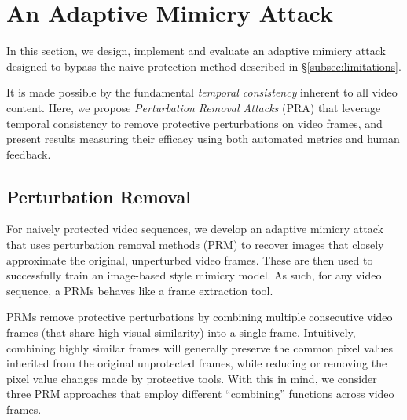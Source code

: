 \secspace
\section{An Adaptive Mimicry Attack} 
\label{sec:eval-limitations}
In this section, we design, implement and evaluate an adaptive mimicry attack
designed to bypass the naive protection method described in
\S\ref{subsec:limitations}. 

It is made possible by the fundamental {\em temporal consistency} inherent to
all video content. Here, we propose {\em Perturbation Removal Attacks} (PRA)
that leverage temporal consistency to remove protective perturbations on
video frames, and present results measuring their efficacy using both
automated metrics and human feedback.

\secspace
\subsection{Perturbation Removal}

For naively protected video sequences, we develop an adaptive mimicry attack
that uses perturbation removal methods (PRM) to recover images that closely
approximate the original, unperturbed video frames. These are then used to
successfully train an image-based style mimicry model.  As such, for any
video sequence, a PRMs behaves like a frame extraction tool.

 PRMs remove protective perturbations
by combining multiple consecutive video frames (that share high visual
similarity) into a single frame. Intuitively, combining highly similar frames
will generally preserve the common pixel values inherited from the original
unprotected frames, while reducing or removing the pixel value changes made
by protective tools.  With this in mind, we consider three PRM approaches that
employ different ``combining'' functions across video frames.

